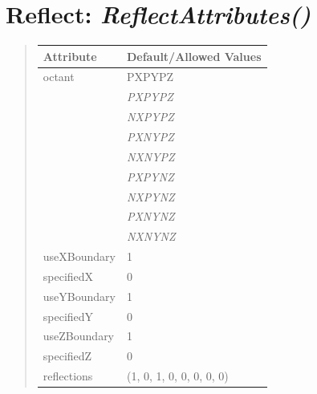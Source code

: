 \documentclass[letterpaper,10pt,english]{sphinxmanual}
\begin{document}
\section{\textbf{Reflect}: \emph{ReflectAttributes()}}
\label{attributes:reflect-reflectattributes}
\begin{DUlineblock}{0em}
\item[] 
\end{DUlineblock}
\begin{quote}

\begin{tabulary}{\linewidth}{|L|L|}
\hline

\textbf{Attribute}
 & 
\textbf{Default/Allowed Values}
\\
\hline
octant
 & 
PXPYPZ
\\
\hline & 
\emph{PXPYPZ}
\\
\hline & 
\emph{NXPYPZ}
\\
\hline & 
\emph{PXNYPZ}
\\
\hline & 
\emph{NXNYPZ}
\\
\hline & 
\emph{PXPYNZ}
\\
\hline & 
\emph{NXPYNZ}
\\
\hline & 
\emph{PXNYNZ}
\\
\hline & 
\emph{NXNYNZ}
\\
\hline
useXBoundary
 & 
1
\\
\hline
specifiedX
 & 
0
\\
\hline
useYBoundary
 & 
1
\\
\hline
specifiedY
 & 
0
\\
\hline
useZBoundary
 & 
1
\\
\hline
specifiedZ
 & 
0
\\
\hline
reflections
 & 
(1, 0, 1, 0, 0, 0, 0, 0)
\\
\hline\end{tabulary}

\end{quote}

\begin{DUlineblock}{0em}
\item[] 
\end{DUlineblock}

\begin{DUlineblock}{0em}
\item[] 
\end{DUlineblock}
\end{document}
